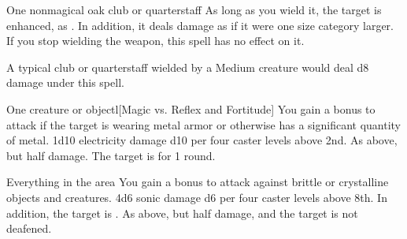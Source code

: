 \begin{spellheader}
    \spelldur{\durshort}
\end{spellheader}
\begin{spelleffects}
    \begin{spelltarget}{One nonmagical oak club or quarterstaff}
        \spelleffect As long as you wield it, the target is enhanced, as . In addition, it deals damage as if it were one size category larger. If you stop wielding the weapon, this spell has no effect on it.
    \end{spelltarget}
\end{spelleffects}
\begin{spellfooter}
    \spellnotes A typical club or quarterstaff wielded by a Medium creature would deal d8 damage under this spell.
\end{spellfooter}

\begin{spellheader}
\end{spellheader}
\begin{spelleffects}
    \begin{spelltarget}{One creature or object}l[Magic vs. Reflex and Fortitude]
        \spellspecial You gain a  bonus to attack if the target is wearing metal armor or otherwise has a significant quantity of metal.
        \spellsuccess[Reflex] 1d10 electricity damage \add d10 per four caster levels above 2nd.
        \spellfailure[Reflex] As above, but half damage.
         The target is \staggered for 1 round.
    \end{spelltarget}
\end{spelleffects}
\begin{spellfooter}
    
\end{spellfooter}

\begin{spellheader}
\end{spellheader}
\begin{spelleffects}
    \begin{spelltargets}{Everything in the area}
        \spellspecial You gain a  bonus to attack against brittle or crystalline objects and creatures.
        \spellsuccess 4d6 sonic damage \add d6 per four caster levels above 8th. In addition, the target is \deafened.
        \spellfailure As above, but half damage, and the target is not deafened.
    \end{spelltargets}
\end{spelleffects}
\begin{spellfooter}
    
\end{spellfooter}


